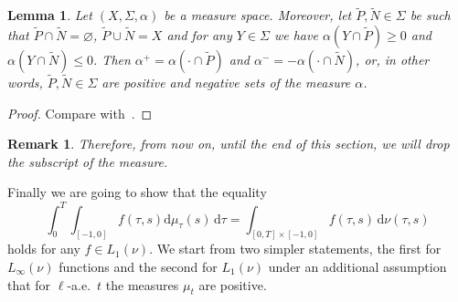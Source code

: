 \documentclass[reqno]{amsart}
\theoremstyle{plain}
\newtheorem{remark}{Remark}[section]
\newtheorem{lemma}{Lemma}[section]
\numberwithin{equation}{section}
\numberwithin{definition}{section}
\newcommand{\dd}{\ensuremath{\mathrm{d}}}
\begin{document}
\begin{lemma}\label{lemma:Hahn-fact}
    Let $(X,\Sigma,\alpha)$ be a measure space. Moreover, let $ \widetilde{P}, \widetilde{N}\in\Sigma$ be such that $\widetilde{P}\cap \widetilde{N}=\varnothing$, $\widetilde{P}\cup \widetilde{N}=X$ and for any $Y\in\Sigma$ we have $\alpha(Y\cap  \widetilde{P})\ge 0$ and $\alpha(Y\cap \widetilde{N})\le 0$. Then $\alpha^+=\alpha(\cdot \cap \widetilde{P})$ and $\alpha^-=-\alpha(\cdot \cap \widetilde{N})$, or, in other words, $\widetilde{P}, \widetilde{N}\in\Sigma$ are positive and negative sets of the measure $\alpha$. 
\end{lemma}
\begin{proof} Compare with~\cite[p. 86, 3.3]{Folland}.   
\end{proof}


\begin{remark}
    Therefore, from now on, until the end of this section, we will drop the subscript of the measure.   
\end{remark}


Finally we are going to show that the equality 
 \begin{equation*}
  \int_0^T \int_{[-1,0]} f(\tau,s)  \dd \mu_{\tau} (s) \,\dd\tau = \int_{[0,T]\times [-1,0]} f(\tau,s)  \,\dd \nu(\tau,s)
\end{equation*}
holds for any $f\in L_1(\nu)$. We start from two simpler statements, the first for $L_{\infty}(\nu)$ functions and the second for $L_1(\nu)$ under an additional assumption that for $\ell$-a.e.\ $t$ the measures $\mu_t$ are positive.       
\end{document}
